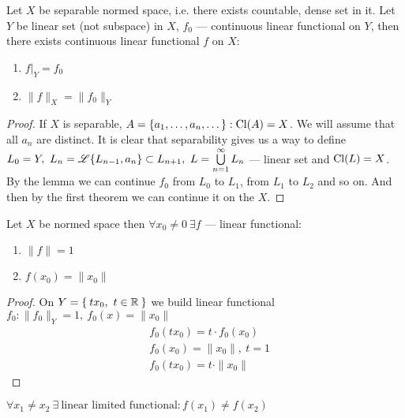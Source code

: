 \begin{thm}
  Let $X$ be separable normed space, i.e. there exists countable, dense set in it.
  Let $Y$ be linear set (not subspace) in $X$, $f_0$ --- continuous linear
  functional on $Y$, then there exists continuous linear functional $f$ on $X$:
  \begin{enumerate}
  \item $f|_Y = f_0$
  \item $\|f\|_X = \|f_0\|_Y$
  \end{enumerate}
\end{thm}

\begin{proof}
  If $X$ is separable, $A = \{a_1, \dotsc, a_n, \dotsc\} : \operatorname{Cl}({A}) = X$. We will
  assume that all $a_n$ are distinct. It is clear that separability gives us a
  way to define $L_0 = Y,\ L_n = \mathscr{L}\{L_{n - 1}, a_n\} \subset L_{n + 1},\ L =
  \bigcup\limits_{n = 1}^\infty L_n$ --- linear set and $\operatorname{Cl}({L}) = X$.
  By the lemma we can continue $f_0$ from $L_0$ to $L_1$, from $L_1$ to $L_2$ and
  so on. And then by the first theorem we can continue it on the $X$.
\end{proof}

\begin{cor}
  Let $X$ be normed space then $\forall x_0 \neq 0\ \exists f$ --- linear
  functional:
  \begin{enumerate}
  \item $\|f\| = 1$
  \item $f(x_0) = \|x_0\|$
  \end{enumerate}
\end{cor}

\begin{proof}
  On $Y = \Set{t x_0,\ t \in \mathbb{R}}$ we build linear functional $f_0 : \|f_0\|_Y =
  1,\ f_0(x) = \|x_0\|$
  \begin{align*}
    &f_0(t x_0) = t \cdot f_0(x_0) \\
    &f_0(x_0) = \|x_0\|,\ t = 1 \\
    &f_0(t x_0) = t \cdot \|x_0\|
  \end{align*}
\end{proof}

\begin{cor}
  $\forall x_1 \neq x_2\ \exists\ \text{linear limited functional} : f(x_1)
  \neq f(x_2)$
\end{cor}

